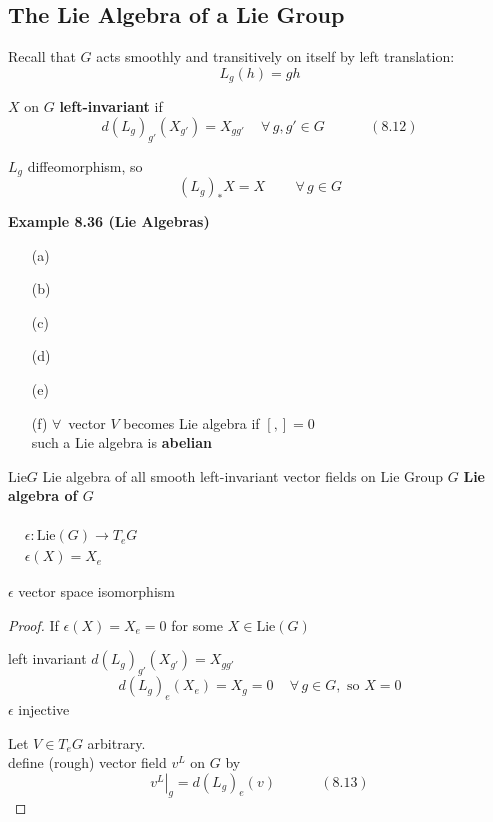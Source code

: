 \subsection*{The Lie Algebra of a Lie Group}

Recall that $G$ acts smoothly and transitively on itself by left translation:
\[
L_g(h) = gh
\]

$X$ on $G$ \textbf{left-invariant} if 
\begin{equation}
d(L_g)_{g'}(X_{g'}) = X_{gg'} \quad \, \forall \, g, g' \in G \quad \quad \quad \, (8.12)
\end{equation}

$L_g$ diffeomorphism, so 
\[
(L_g)_*X = X \quad \quad \, \forall \, g \in G
\]





\textbf{Example 8.36 (Lie Algebras)}

\begin{enumerate}
\item[(a)]
\item[(b)]
\item[(c)]
\item[(d)]
\item[(e)]
\item[(f)] $\forall \, $ vector $V$ becomes Lie algebra if $[,]=0$ \\
such a Lie algebra is \textbf{abelian}
\end{enumerate}

$\text{Lie}{G}$ Lie algebra of all smooth left-invariant vector fields on Lie Group $G$ \textbf{ Lie algebra of $G$ }



\begin{theorem}[8.37] $\begin{aligned}  & \quad \\
    & \epsilon : \text{Lie}{(G)} \to T_eG \\ 
    & \epsilon(X) = X_e \end{aligned}$

$\epsilon$ vector space isomorphism
\end{theorem}

\begin{proof}
  If $\epsilon(X) = X_e = 0$ for some $X \in \text{Lie}{(G)}$

left invariant $d(L_g)_{g'}(X_{g'}) = X_{gg'}$
\[
d(L_g)_e(X_e) = X_g=0 \quad \, \forall \, g \in G, \text{ so } X= 0 
\]
$\epsilon$ injective

Let $V \in T_eG$ arbitrary. \\
\quad define (rough) vector field $v^L$ on $G$ by 
\begin{equation}
  \left. v^L \right|_g = d(L_g)_e(v) \quad \quad \quad \, (8.13)
\end{equation}

\end{proof}





